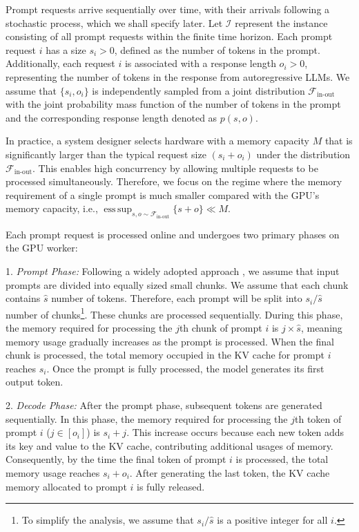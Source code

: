 \documentclass{article}
\DeclareMathOperator*{\esssup}{ess\,sup}
\newcommand{\xhdr}[1]{\vspace{1mm} \noindent{\bf #1}}
\theoremstyle{plain}
\theoremstyle{definition}
\theoremstyle{remark}
\begin{document}
 

Prompt requests arrive sequentially over time, with their arrivals following a stochastic process, which we shall specify later. Let \( \mathcal{I} \) represent the instance consisting of all prompt requests within the finite time horizon. Each prompt request \( i \) has a size \( s_i > 0 \), defined as the number of tokens in the prompt. Additionally, each request \( i \) is associated with a response length \( o_i > 0 \), representing the number of tokens in the response from autoregressive LLMs. We assume that \(\{s_i,o_i\} \) is independently sampled from a joint distribution $\mathcal{F}_{\text{in-out}}$ with the joint probability mass function of the number of tokens in the prompt and the corresponding response length denoted as $p(s,o)$.

In practice, a system designer selects hardware with a memory capacity $M$ that is significantly larger than the typical request size $(s_i + o_i)$ under the distribution $\mathcal{F}_{\text{in-out}}$. This enables high concurrency by allowing multiple requests to be processed simultaneously. Therefore, we focus on the regime where the memory requirement of a single prompt is much smaller compared with the GPU’s memory capacity, i.e.,	
$
{\esssup_{s,o\sim\mathcal{F}_{\text{in-out}}} \{ s+ o \}}\ll{M}.
$




\xhdr{Prompt Processing.} Each prompt request is processed online and undergoes two primary phases on the GPU worker:

1. \textit{Prompt Phase:} Following a widely adopted approach \cite{agrawal2024taming, ratner2022parallel, yen2024long, an2024training}, we assume that input prompts are divided into equally sized small chunks. We assume that each chunk contains 
$\hat{s}$ number of tokens.   
Therefore, each prompt  will be split into $s_i/\hat{s}$ number of chunks\footnote{To simplify the analysis, we assume that $s_i/\hat{s}$ is a positive integer for all $i$.}. These chunks are processed sequentially. During this phase, the memory required for processing the \(j\)th chunk of prompt \(i\) is \( j \times \hat{s} \), 
meaning memory usage gradually increases as the prompt is processed. When the final chunk is processed, the total memory occupied in the KV cache for prompt \( i \) reaches \( s_i \). Once the prompt is fully processed, the model generates its first output token.

2. \textit{Decode Phase:} After the prompt phase, subsequent tokens are generated sequentially. In this phase, the memory required for processing the \( j \)th token of prompt \( i \) (\( j \in [o_i] \)) is \( s_i + j \). This increase occurs because each new token adds its key and value to the KV cache, contributing additional usages of memory. Consequently, by the time the final token of prompt \( i \) is processed, the total memory usage reaches \( s_i + o_i \). After generating the last token, the KV cache memory allocated to prompt \( i \) is fully released.
\end{document}
